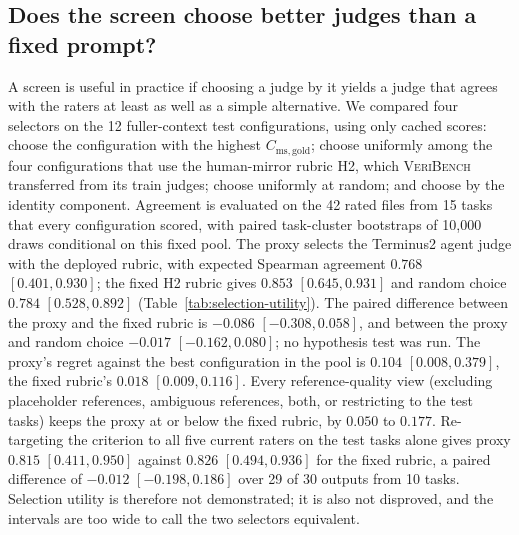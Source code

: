 \subsection{Does the screen choose better judges than a fixed prompt?}\label{sec:selection-utility}
A screen is useful in practice if choosing a judge by it yields a judge that agrees with the raters at least as well as a simple alternative.
We compared four selectors on the 12 fuller-context test configurations, using only cached scores: choose the configuration with the highest $C_{\mathrm{ms,gold}}$; choose uniformly among the four configurations that use the human-mirror rubric H2, which \textsc{VeriBench} transferred from its train judges; choose uniformly at random; and choose by the identity component.
Agreement is evaluated on the 42 rated files from 15 tasks that every configuration scored, with paired task-cluster bootstraps of 10{,}000 draws conditional on this fixed pool.
The proxy selects the Terminus2 agent judge with the deployed rubric, with expected Spearman agreement $0.768$ $[0.401, 0.930]$; the fixed H2 rubric gives $0.853$ $[0.645, 0.931]$ and random choice $0.784$ $[0.528, 0.892]$ (Table~\ref{tab:selection-utility}).
The paired difference between the proxy and the fixed rubric is $-0.086$ $[-0.308, 0.058]$, and between the proxy and random choice $-0.017$ $[-0.162, 0.080]$; no hypothesis test was run.
The proxy's regret against the best configuration in the pool is $0.104$ $[0.008, 0.379]$, the fixed rubric's $0.018$ $[0.009, 0.116]$.
Every reference-quality view (excluding placeholder references, ambiguous references, both, or restricting to the test tasks) keeps the proxy at or below the fixed rubric, by $0.050$ to $0.177$.
Re-targeting the criterion to all five current raters on the test tasks alone gives proxy $0.815$ $[0.411, 0.950]$ against $0.826$ $[0.494, 0.936]$ for the fixed rubric, a paired difference of $-0.012$ $[-0.198, 0.186]$ over 29 of 30 outputs from 10 tasks.
Selection utility is therefore not demonstrated; it is also not disproved, and the intervals are too wide to call the two selectors equivalent.


